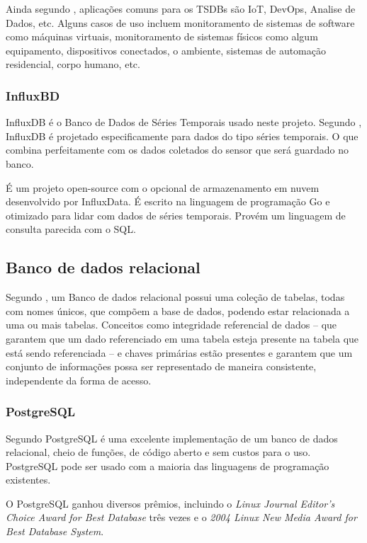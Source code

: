 Ainda segundo \cite{Noor2017}, aplicações comuns para os TSDBs são IoT, DevOps, Analise de Dados, etc. Alguns casos de uso incluem monitoramento de sistemas de software como máquinas virtuais, monitoramento de sistemas físicos como algum equipamento, dispositivos conectados, o ambiente, sistemas de automação residencial, corpo humano, etc.

\subsubsection{InfluxBD}

InfluxDB é o Banco de Dados de Séries Temporais usado neste projeto. Segundo \cite{Lundrigan2017}, InfluxDB é projetado especificamente para dados do tipo séries temporais. O que combina perfeitamente com os dados coletados do sensor que será guardado no banco.

É um projeto open-source com o opcional de armazenamento em nuvem desenvolvido por InfluxData. É escrito na linguagem de programação Go e otimizado para lidar com dados de séries temporais. Provém um linguagem de consulta parecida com o SQL. \cite{Noor2017}

\subsection{Banco de dados relacional}

Segundo \cite{bancosrelacionais}, um Banco de dados relacional possui uma coleção de tabelas, todas com nomes únicos, que compõem a base de
dados, podendo estar relacionada a uma ou mais tabelas. Conceitos como integridade referencial de dados – que garantem que um dado referenciado em uma tabela esteja presente na tabela que está sendo referenciada – e chaves primárias estão presentes e garantem que um conjunto de informações possa ser representado de maneira consistente, independente da forma de acesso.

\subsubsection{PostgreSQL}

Segundo \cite{stones2006beginning} PostgreSQL é uma excelente implementação de um banco de dados relacional, cheio de funções, de código aberto e sem custos para o uso.
PostgreSQL pode ser usado com a maioria das linguagens de programação existentes.

O PostgreSQL ganhou diversos prêmios, incluindo o \textit{Linux Journal Editor's Choice Award for Best Database} três vezes e o \textit{2004 Linux New Media Award for Best Database System}.

